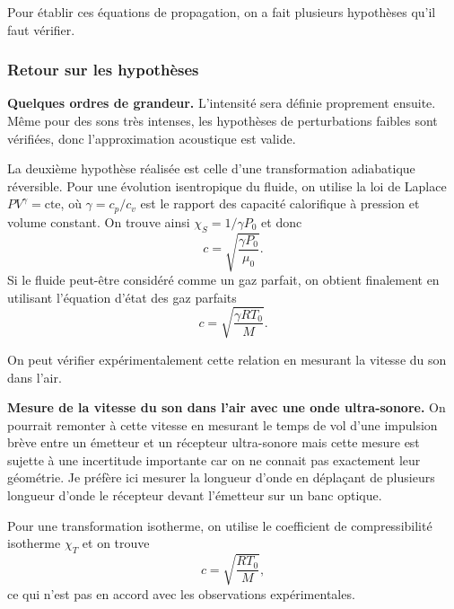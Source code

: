 \begin{transition}
Pour établir ces équations de propagation, on a fait plusieurs hypothèses qu'il faut vérifier.
\end{transition}

\subsubsection{Retour sur les hypothèses}

\begin{slide}
\textbf{Quelques ordres de grandeur.}
L'intensité sera définie proprement ensuite.
Même pour des sons très intenses, les hypothèses de perturbations faibles sont vérifiées, donc l'approximation acoustique est valide.
\end{slide}

La deuxième hypothèse réalisée est celle d'une transformation adiabatique réversible.
Pour une évolution isentropique du fluide, on utilise la loi de Laplace $PV^\gamma = \mathrm{cte}$, où $\gamma=c_p/c_v$ est le rapport des capacité calorifique à pression et volume constant.
On trouve ainsi $\chi_S = 1/\gamma P_0$ et donc
\begin{equation*}
c = \sqrt{\frac{\gamma P_0}{\mu_0}}.
\end{equation*}
Si le fluide peut-être considéré comme un gaz parfait, on obtient finalement en utilisant l'équation d'état des gaz parfaits
\begin{equation}
c = \sqrt{\frac{\gamma RT_0}{M}}.
\end{equation}

On peut vérifier expérimentalement cette relation en mesurant la vitesse du son dans l'air.
\begin{experience}
\textbf{Mesure de la vitesse du son dans l'air avec une onde ultra-sonore.}
On pourrait remonter à cette vitesse en mesurant le temps de vol d'une impulsion brève entre un émetteur et un récepteur ultra-sonore mais cette mesure est sujette à une incertitude importante car on ne connait pas exactement leur géométrie.
Je préfère ici mesurer la longueur d'onde en déplaçant de plusieurs longueur d'onde le récepteur devant l'émetteur sur un banc optique.
\end{experience}

\begin{remarque}
Pour une transformation isotherme, on utilise le coefficient de compressibilité isotherme $\chi_T$ et on trouve
\begin{equation*}
c = \sqrt{\frac{RT_0}{M}},
\end{equation*}
ce qui n'est pas en accord avec les observations expérimentales.
\end{remarque}

